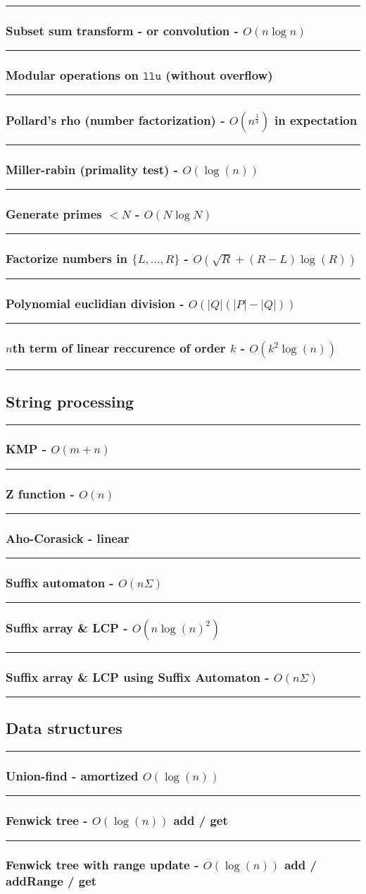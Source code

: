 \documentclass[landscape,a4paper,twocolumn,10pt]{report}
\renewcommand{\line}{\noindent\rule{\linewidth}{1pt}}
\newcommand{\algosection}[1]{\line \subsection*{#1}}
\newcommand{\algorithm}[1]{\line \subsubsection*{#1}}
\begin{document}
\algorithm{Subset sum transform - or convolution - $O(n \log n)$}


\algorithm{Modular operations on $\texttt{llu}$ (without overflow)}


\algorithm{Pollard's rho (number factorization) - $O(n^{\frac{1}{4}})$ in expectation}


\algorithm{Miller-rabin (primality test) - $O(\log(n))$}


\algorithm{Generate primes $< N$ - $O(N \log N)$}


\algorithm{Factorize numbers in $\{L, \dots, R\}$ - $O(\sqrt{R} + (R-L) \log(R))$}


\algorithm{Polynomial euclidian division - $O(|Q|(|P|-|Q|))$}


\algorithm{$n$th term of linear reccurence of order $k$ - $O(k^2 \log(n))$}


\algosection{String processing}
\label{string}

\algorithm{KMP - $O(m+n)$}


\algorithm{Z function - $O(n)$}


\algorithm{Aho-Corasick - linear}


\algorithm{Suffix automaton - $O(n \Sigma)$}


\algorithm{Suffix array \& LCP - $O(n \log(n)^2)$}


\algorithm{Suffix array \& LCP using Suffix Automaton - $O(n \Sigma)$}


\algosection{Data structures}
\label{datastruct}

\algorithm{Union-find - amortized $O(\log(n))$}


\algorithm{Fenwick tree - $O(\log(n))$ add / get}


\algorithm{Fenwick tree with range update - $O(\log(n))$ add / addRange / get}

\end{document}
